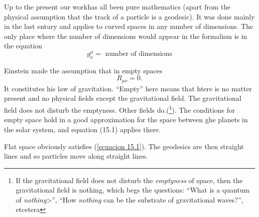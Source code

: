 Up to the present our workhas all been pure mathematics (apart from the physical assumption that the track of a 
particle is a geodesic). It was done mainly in the last entury and applies to curved spaces in any number of 
dimensions. The only place where the number of dimensions would appear in the formalism is in the equation 
\[g^{\mu}_{\nu} = \mbox{ number of dimensions}\]

    Einstein made the assumption that in empty spaces
\begin{equation}
    \label{ecuacion 15.1}
    R_{\mu\nu} = 0.
\end{equation}
It constitutes his law of gravitation. ``Empty'' here means that htere is no matter present and no physical fields 
except the gravitational field. The gravitational field does not disturb the emptyness. Other fields do.(\footnote{If 
the gravitational field does not disturb the \emph{emptyness} of space, then the gravitational field is nothing, which 
begs the questions: ``What is a quantum of \emph{nothing}>'', ``How \emph{nothing} can be the substrate of 
gravitational waves?'', etcetera}). The conditions for empty space hold in a good approximation for the space between 
ghe planets in the solar system, and equation (15.1) applies there. 

Flat space obviously satisfies (\ref{ecuacion 15.1}). The geodesics are then straight lines and so particles move along 
straight lines. 

